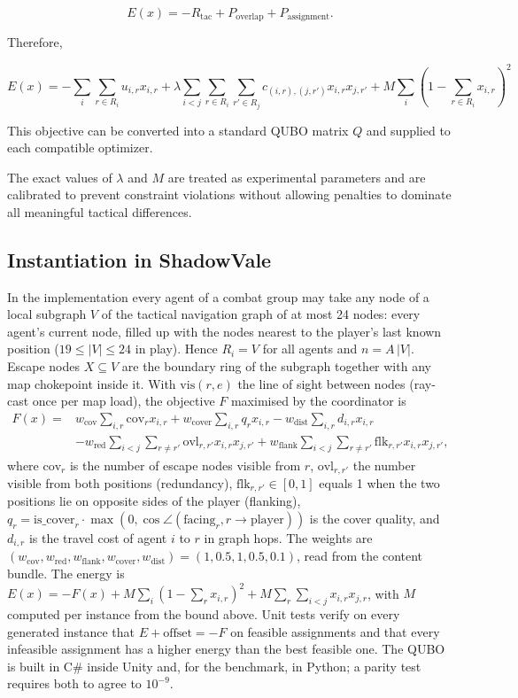 \documentclass[12pt, a4paper]{article}
\begin{document}
$$
E(x)
=
-
R_{\text{tac}}
+
P_{\text{overlap}}
+
P_{\text{assignment}}.
$$

Therefore,

$$
\boxed{
E(x)
=
-
\sum_i\sum_{r\in R_i}
u_{i,r}x_{i,r}
+
\lambda
\sum_{i<j}
\sum_{r\in R_i}
\sum_{r'\in R_j}
c_{(i,r),(j,r')}
x_{i,r}x_{j,r'}
+
M
\sum_i
\left(
1-\sum_{r\in R_i}x_{i,r}
\right)^2
}
$$

This objective can be converted into a standard QUBO matrix $Q$ and supplied to each compatible optimizer.

The exact values of $\lambda$ and $M$ are treated as experimental parameters and are calibrated to prevent constraint violations without allowing penalties to dominate all meaningful tactical differences.

\subsection*{Instantiation in ShadowVale}

In the implementation every agent of a combat group may take any node of a local subgraph $V$ of the tactical navigation graph of at most 24 nodes: every agent's current node, filled up with the nodes nearest to the player's last known position ($19 \le |V| \le 24$ in play). Hence $R_i = V$ for all agents and $n = A\,|V|$. Escape nodes $X \subseteq V$ are the boundary ring of the subgraph together with any map chokepoint inside it. With $\mathrm{vis}(r, e)$ the line of sight between nodes (ray-cast once per map load), the objective $F$ maximised by the coordinator is
$$
\begin{aligned}
F(x) ={}& w_{\text{cov}}\sum_{i,r} \mathrm{cov}_r x_{i,r}
+ w_{\text{cover}}\sum_{i,r} q_r x_{i,r}
- w_{\text{dist}}\sum_{i,r} d_{i,r} x_{i,r}\\
&- w_{\text{red}}\sum_{i<j}\sum_{r\neq r'} \mathrm{ovl}_{r,r'} x_{i,r}x_{j,r'}
+ w_{\text{flank}}\sum_{i<j}\sum_{r\neq r'} \mathrm{flk}_{r,r'} x_{i,r}x_{j,r'},
\end{aligned}
$$
where $\mathrm{cov}_r$ is the number of escape nodes visible from $r$, $\mathrm{ovl}_{r,r'}$ the number visible from both positions (redundancy), $\mathrm{flk}_{r,r'} \in [0,1]$ equals 1 when the two positions lie on opposite sides of the player (flanking), $q_r = \mathrm{is\_cover}_r \cdot \max(0, \cos\angle(\text{facing}_r, r \to \text{player}))$ is the cover quality, and $d_{i,r}$ is the travel cost of agent $i$ to $r$ in graph hops. The weights are $(w_{\text{cov}}, w_{\text{red}}, w_{\text{flank}}, w_{\text{cover}}, w_{\text{dist}}) = (1, 0.5, 1, 0.5, 0.1)$, read from the content bundle. The energy is $E(x) = -F(x) + M\sum_i(1-\sum_r x_{i,r})^2 + M\sum_r\sum_{i<j} x_{i,r}x_{j,r}$, with $M$ computed per instance from the bound above. Unit tests verify on every generated instance that $E + \text{offset} = -F$ on feasible assignments and that every infeasible assignment has a higher energy than the best feasible one. The QUBO is built in C\# inside Unity and, for the benchmark, in Python; a parity test requires both to agree to $10^{-9}$.
\end{document}
